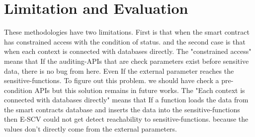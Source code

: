 \section{Limitation and Evaluation}



These methodologies have two limitations. First is that when the smart contract has constrained access with the condition of status. and the second case is that when each context is connected with databases directly. 
The "constrained access" means that If the auditing-APIs that are check parameters exist before sensitive data, there is no bug from here. Even If the external parameter reaches the sensitive-functions. To figure out this problem. we should have check a pre-condition APIs but this solution remains in future works.
The "Each context is connected with databases directly" means that If a function loads the data from the smart contracts database and inserts the data into the sensitive-functions then E-SCV could not get detect reachability to sensitive-functions. because the values don't directly come from the external parameters. 



